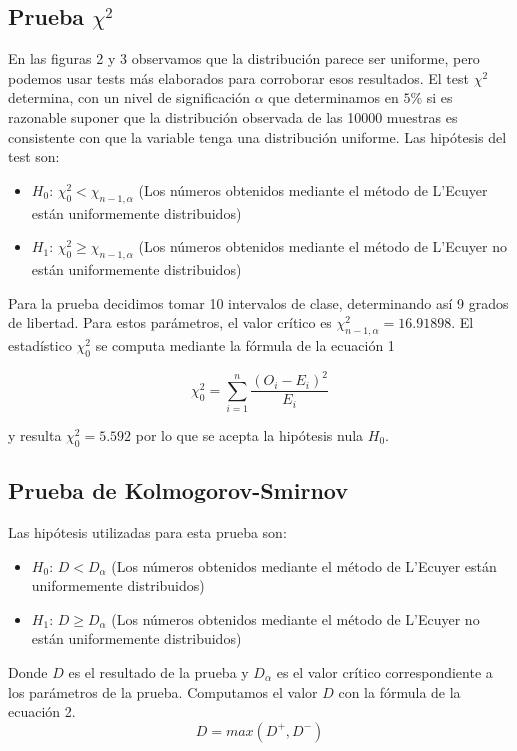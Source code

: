 \documentclass[10pt,journal,compsoc]{IEEEtran}
\begin{document}
\subsection{Prueba $\chi^2$}
En las figuras 2 y 3 observamos que la distribuci\'on parece ser uniforme, pero podemos usar
tests m\'as elaborados para corroborar esos resultados. El test $\chi^2$ determina, con un nivel
de significaci\'on $\alpha$ que determinamos en $5\%$ si es razonable suponer que la distribuci\'on 
observada de las 10000 muestras es consistente con que la variable tenga una distribuci\'on uniforme.
Las hip\'otesis del test son:
\begin{itemize}
 \item {$H_{0}$:} $\chi_{0}^2 < \chi_{n-1,\alpha}$ (Los n\'umeros obtenidos mediante el m\'etodo de L'Ecuyer est\'an uniformemente distribuidos)
 \item {$H_{1}$:} $\chi_{0}^2 \ge \chi_{n-1,\alpha}$ (Los n\'umeros obtenidos mediante el m\'etodo de L'Ecuyer no est\'an uniformemente distribuidos)
\end{itemize}
Para la prueba decidimos tomar 10 intervalos de clase, determinando as\'i 9 grados de libertad. Para estos
par\'ametros, el valor cr\'itico es $\chi_{n-1,\alpha}^{2} = 16.91898$. El estad\'istico $\chi_{0}^{2}$ se computa
mediante la f\'ormula de la ecuaci\'on 1

\begin{equation}
 \chi_{0}^{2} = \sum_{i=1}^{n} \frac{(O_i - E_i)^2}{E_i}
\end{equation}

y resulta $\chi_{0}^{2} = 5.592$ por lo que se acepta la hip\'otesis nula $H_0$.

\subsection{Prueba de Kolmogorov-Smirnov}
Las hip\'otesis utilizadas para esta prueba son:
\begin{itemize}
 \item {$H_{0}$:} $D < D_{\alpha}$ (Los n\'umeros obtenidos mediante el m\'etodo de L'Ecuyer est\'an uniformemente distribuidos)
 \item {$H_{1}$:} $D \ge D_{\alpha}$ (Los n\'umeros obtenidos mediante el m\'etodo de L'Ecuyer no est\'an uniformemente distribuidos)
\end{itemize}
Donde $D$ es el resultado de la prueba y $D_{\alpha}$ es el valor cr\'itico correspondiente a los par\'ametros de la prueba.
Computamos el valor $D$ con la f\'ormula de la ecuaci\'on 2.
\begin{equation}
 D = max(D^{+}, D^{-})
\end{equation}
\end{document}
